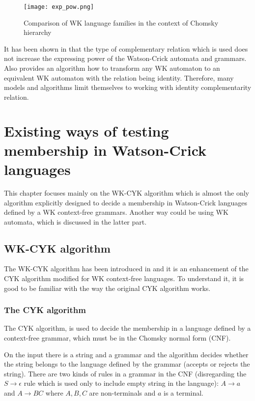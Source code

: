 \begin{figure}[ht]
  \texttt{[image: exp\_pow.png]}
  \centering
  \label{fig:expr-power}
  \caption{Comparison of WK language families in the context of Chomsky hierarchy}
\end{figure}

It has been shown in \cite{COMPL_REL} that the type of complementary relation which is used does not increase the expressing power of the Watson-Crick automata and grammars. Also \cite{SURVEY} provides an algorithm how to transform any WK automaton to an equivalent WK automaton with the relation being identity. Therefore, many models and algorithms limit themselves to working with identity complementarity relation.

\chapter{Existing ways of testing membership in Watson-Crick languages} \label{chapter:WK_CYK}

This chapter focuses mainly on the WK-CYK algorithm which is almost the only algorithm explicitly designed to decide a membership in Watson-Crick languages defined by a WK context-free grammars. Another way could be using WK automata, which is discussed in the latter part.

\section{WK-CYK algorithm}
The WK-CYK algorithm has been introduced in \cite{WK_CYK} and it is an enhancement of the CYK algorithm modified for WK context-free languages. To understand it, it is good to be familiar with the way the original CYK algorithm works.

\subsection{The CYK algorithm}
The CYK algorithm, is used to decide the membership in a language defined by a context-free grammar, which must be in the Chomsky normal form (CNF).

On the input there is a string and a grammar and the algorithm decides whether the string belongs to the language defined by the grammar (accepts or rejects the string). There are two kinds of rules in a grammar in the CNF (disregarding the $S \rightarrow \epsilon$ rule which is used only to include empty string in the language): $A \rightarrow a$ and $A \rightarrow BC$ where $A, B, C$ are non-terminals and $a$ is a terminal.

